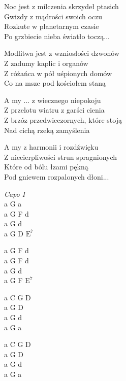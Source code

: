 \begin{text}
    \chordfill
    Noc jest z milczenia skrzydeł ptasich\\
    Gwizdy z mądrości swoich oczu\\
    Rozkute w planetarnym czasie\\
    Po grzbiecie nieba światło toczą...

    Modlitwa jest z wzniosłości dzwonów\\
    Z zadumy kaplic i organów\\
    Z różańca w pół uśpionych domów\\
    Co na msze pod kościołem staną

    A my ... z wiecznego niepokoju\\
    Z przelotu wiatru z garści cienia\\
    Z brzóz przedwieczornych, które stoją\\
    Nad cichą rzeką zamyślenia

    A my z harmonii i rozdźwięku\\
    Z niecierpliwości strun spragnionych\\
    Które od bólu łzami pękną\\
    Pod gniewem rozpalonych dłoni...
\end{text}
\begin{chord}
    \textit{Capo I}\\
    a G a\\
    a G F d\\
    a G d\\
    a G D $\mathrm{E^{7}}$

    a G F d\\
    a G F d\\
    a G d\\
    a G F $\mathrm{E^{7}}$

    a C G D\\
    a G D\\
    a G d\\
    a G a

    a C G D\\
    a G D\\
    a G d\\
    a G a
\end{chord}
